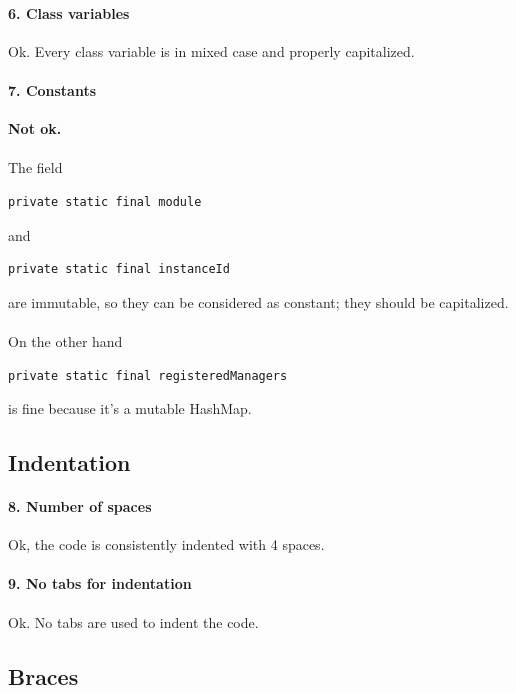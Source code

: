 \documentclass[english]{article}
\begin{document}
\paragraph{6. Class variables}
Ok. Every class variable is in mixed case and properly capitalized.

\paragraph{7. Constants}
\textcolor{cornellred}{\textbf{Not ok.}}
\paragraph{}
The field 
\begin{lstlisting} 
private static final module 
\end{lstlisting} 
and 
\begin{lstlisting} 
private static final instanceId 
\end{lstlisting} 
are immutable, so they can be considered as constant; they should be capitalized. 

\paragraph{}
On the other hand
\begin{lstlisting} 
private static final registeredManagers 
\end{lstlisting}
 is fine because it's a mutable HashMap.


\subsection{Indentation}

\paragraph{8. Number of spaces}
Ok, the code is consistently indented with 4 spaces.

\paragraph{9. No tabs for indentation}
Ok. No tabs are used to indent the code.

\subsection{Braces}
\end{document}
